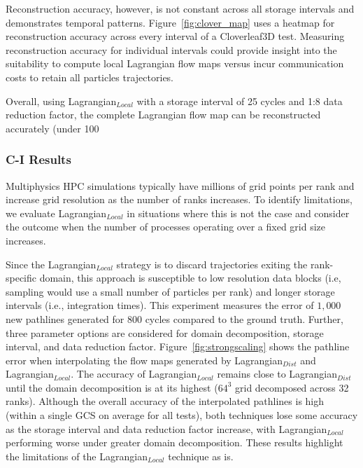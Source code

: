 Reconstruction accuracy, however, is not constant across all storage intervals and demonstrates temporal patterns.
%
%
Figure~\ref{fig:clover_map} uses a heatmap for reconstruction accuracy across every interval of a Cloverleaf3D test. 
%
Measuring reconstruction accuracy for individual intervals could provide insight into the suitability to compute local Lagrangian flow maps versus incur communication costs to retain all particles trajectories.
%





Overall, using Lagrangian$_{Local}$ with a storage interval of 25 cycles and 1:8 data reduction factor, the complete Lagrangian flow map can be reconstructed accurately (under 100%

\subsubsection{C-I Results} 
%

%
Multiphysics HPC simulations typically have millions of grid points per rank and increase grid resolution as the number of ranks increases. 
%
To identify limitations, we evaluate Lagrangian$_{Local}$ in situations where this is not the case and consider the outcome when the number of processes operating over a fixed grid size increases.
%
%

Since the Lagrangian$_{Local}$ strategy is to discard trajectories exiting the rank-specific domain, this approach is susceptible to low resolution data blocks (i.e, sampling would use a small number of particles per rank) and longer storage intervals (i.e., integration times).
%
This experiment measures the error of $1,000$ new pathlines generated for 800 cycles compared to the ground truth. 
%
Further, three parameter options are considered for domain decomposition, storage interval, and data reduction factor. 
%
Figure~\ref{fig:strongscaling} shows the pathline error when interpolating the flow maps generated by Lagrangian$_{Dist}$ and Lagrangian$_{Local}$. 
%
The accuracy of Lagrangian$_{Local}$ remains close to Lagrangian$_{Dist}$ until the domain decomposition is at its highest ($64^{3}$ grid decomposed across 32 ranks).
%
%
Although the overall accuracy of the interpolated pathlines is high (within a single GCS on average for all tests), both techniques lose some accuracy as the storage interval and data reduction factor increase, with Lagrangian$_{Local}$ performing worse under greater domain decomposition.
%
These results highlight the limitations of the Lagrangian$_{Local}$ technique as is.
%

